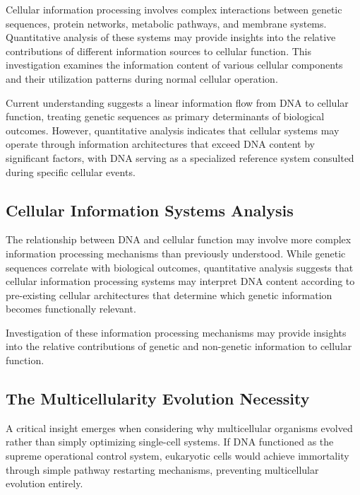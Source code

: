 \documentclass[12pt,a4paper]{article}
\begin{document}
Cellular information processing involves complex interactions between genetic sequences, protein networks, metabolic pathways, and membrane systems. Quantitative analysis of these systems may provide insights into the relative contributions of different information sources to cellular function. This investigation examines the information content of various cellular components and their utilization patterns during normal cellular operation.

Current understanding suggests a linear information flow from DNA to cellular function, treating genetic sequences as primary determinants of biological outcomes. However, quantitative analysis indicates that cellular systems may operate through information architectures that exceed DNA content by significant factors, with DNA serving as a specialized reference system consulted during specific cellular events.

\subsection{Cellular Information Systems Analysis}

The relationship between DNA and cellular function may involve more complex information processing mechanisms than previously understood. While genetic sequences correlate with biological outcomes, quantitative analysis suggests that cellular information processing systems may interpret DNA content according to pre-existing cellular architectures that determine which genetic information becomes functionally relevant.

Investigation of these information processing mechanisms may provide insights into the relative contributions of genetic and non-genetic information to cellular function.

\subsection{The Multicellularity Evolution Necessity}

A critical insight emerges when considering why multicellular organisms evolved rather than simply optimizing single-cell systems. If DNA functioned as the supreme operational control system, eukaryotic cells would achieve immortality through simple pathway restarting mechanisms, preventing multicellular evolution entirely.
\end{document}
